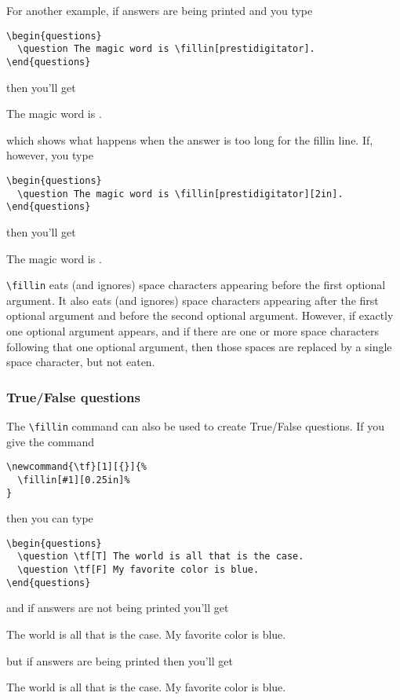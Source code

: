 \documentclass[12pt]{exam}
\begin{document}
For another example, if answers are being printed and you type
\begin{verbatim}
\begin{questions}
  \question The magic word is \fillin[prestidigitator].
\end{questions}
\end{verbatim}
then you'll get
\printanswers
\begin{questions}
  \question The magic word is \fillin[prestidigitator].
\end{questions}
\noprintanswers
which shows what happens when the answer is too long for the fillin
line.  If, however, you type
\begin{verbatim}
\begin{questions}
  \question The magic word is \fillin[prestidigitator][2in].
\end{questions}
\end{verbatim}
then you'll get
\printanswers
\begin{questions}
  \question The magic word is \fillin[prestidigitator][2in].
\end{questions}
\noprintanswers

\verb"\fillin" eats (and ignores) space characters appearing before
the first optional argument.  It also eats (and ignores) space
characters appearing after the first optional argument and before the
second optional argument.  However, if exactly one optional argument
appears, and if there are one or more space characters following that
one optional argument, then those spaces are replaced by a single
space character, but not eaten.
\subsubsection{True/False questions}
\label{sec:truefalse}

The \verb"\fillin" command can also be used to create True/False
questions.  If you give the command
\begin{verbatim}
\newcommand{\tf}[1][{}]{%
  \fillin[#1][0.25in]%
}
\end{verbatim}
then you can type
\begin{verbatim}
\begin{questions}
  \question \tf[T] The world is all that is the case.
  \question \tf[F] My favorite color is blue.
\end{questions}
\end{verbatim}
\newcommand{\tf}[1][{}]{%
  \fillin[#1][0.25in]%
}
and if answers are not being printed you'll get
\begin{questions}
  \question \tf[T] The world is all that is the case.
  \question \tf[F] My favorite color is blue.
\end{questions}
but if answers are being printed then you'll get
\printanswers
\begin{questions}
  \question \tf[T] The world is all that is the case.
  \question \tf[F] My favorite color is blue.
\end{questions}
\noprintanswers
\end{document}
